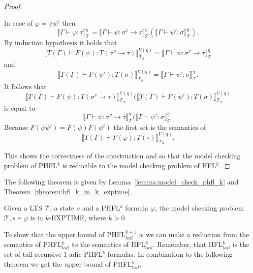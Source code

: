 \begin{proof}
\begin{compactitem}
        \item In case of $\varphi = \psi\psi'$ then
        \[\llbracket \Gamma \vdash \varphi \colon \tau \rrbracket^\eta_\mathcal{T} = \llbracket \Gamma \vdash \psi
        \colon \sigma^v \rightarrow \tau \rrbracket^\eta_\mathcal{T}(\llbracket \Gamma \vdash \psi' \colon
        \sigma \rrbracket^\eta_\mathcal{T}).\]
        By induction hypothesis it holds that \[\llbracket T(\Gamma) \vdash F(\psi) \colon T
        (\sigma^v \rightarrow \tau) \rrbracket^{V(\eta)}_{\mathcal{T}_d} = \llbracket \Gamma
        \vdash \psi \colon \sigma^v \rightarrow \tau \rrbracket^\eta_\mathcal{T}\]
        and
        \[\llbracket T(\Gamma) \vdash F(\psi') \colon T
        (\sigma) \rrbracket^{V(\eta)}_{\mathcal{T}_d} = \llbracket \Gamma
        \vdash \psi' \colon \sigma \rrbracket^\eta_\mathcal{T}.\]
        It follows that
        \[\llbracket T(\Gamma) \vdash F(\psi) \colon T
        (\sigma^v \rightarrow \tau) \rrbracket^{V(\eta)}_{\mathcal{T}_d}(\llbracket T(\Gamma) \vdash F(\psi') \colon T
        (\sigma) \rrbracket^{V(\eta)}_{\mathcal{T}_d}\]
        is equal to
        \[\llbracket \Gamma \vdash \psi
        \colon \sigma^v \rightarrow \tau \rrbracket^\eta_\mathcal{T}(\llbracket \Gamma \vdash \psi' \colon \sigma
        \rrbracket^\eta_\mathcal{T}.\]
        Because $F(\psi\psi') = F(\psi)F(\psi')$ the first set is the semantics of
        \[\llbracket T(\Gamma) \vdash F(\varphi) \colon T(\tau) \rrbracket^{V(\eta)}_{\mathcal{T}_d}.\]
    \end{compactitem}
    This shows the correctness of the construction and so that the model checking problem of PHFL$^k$ is reducible to
    the model checking problem of HFL$^k$.
\end{proof}

The following theorem is given by Lemma~\ref{lemma:model_check_phfl_k} and Theorem~\ref{theorem:hfl_k_in_k_exptime}.

\begin{theorem}
    \label{theorem:phfl_k_in_k_exptime}
    Given a LTS $\mathcal{T}$, a state $s$ and a PHFL$^k$ formula $\varphi$, the model checking problem $\mathcal{T}, s
    \models \varphi$ is in $k$-EXPTIME, where $k > 0$.
\end{theorem}

To show that the upper bound of PHFL$^{k + 1}_{tail}$ is  we can make a reduction from the semantics of
PHFL$^{k}_{tail}$ to the semantics of HFL$^k_{tail}$. Remember, that HFL$^k_{tail}$ is the set of tail-recursive
$1$-adic PHFL$^k$ formulas. In combination to the following theorem we get the upper bound
of PHFL$^k_{tail}$.

